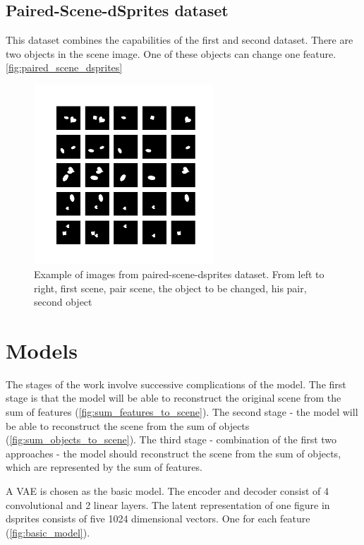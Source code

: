 \documentclass{article}
\begin{document}
    \subsection{Paired-Scene-dSprites dataset}

    This dataset combines the capabilities of the first and second dataset.
    There are two objects in the scene image.
    One of these objects can change one feature. \autoref{fig:paired_scene_dsprites}

    \begin{figure}[ht]
        \centering
        \includegraphics[width=0.6\textwidth]{img/datasets/paired-scenes-dsprites}
        \caption{Example of images from paired-scene-dsprites dataset. From left to right,
            first scene, pair scene, the object to be changed, his pair, second object}
        \label{fig:paired_scene_dsprites}
    \end{figure}


    \section{Models}

    The stages of the work involve successive complications of the model.
    The first stage is that the model will be able to reconstruct the
    original scene from the sum of features (\autoref{fig:sum_features_to_scene}).
    The second stage - the model will be able to reconstruct the scene
    from the sum of objects (\autoref{fig:sum_objects_to_scene}). The third stage - combination of the first
    two approaches - the model should reconstruct the scene
    from the sum of objects, which are represented by the sum of features.

    A VAE is chosen as the basic model. The encoder and
    decoder consist of 4 convolutional and 2 linear layers. The latent
    representation of one figure in dsprites consists of five 1024
    dimensional vectors. One for each feature (\autoref{fig:basic_model}).
\end{document}
